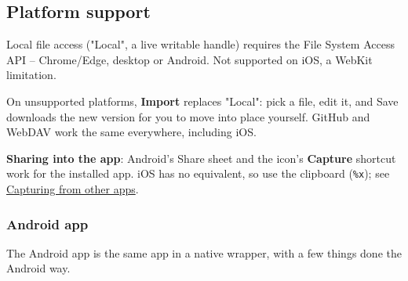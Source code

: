 \documentclass[11pt]{article}
\begin{document}
\subsection{Platform support}
\label{sec:orgc1b1d56}
Local file access ("Local", a live writable handle) requires the File System Access API -- Chrome/Edge, desktop or Android. Not supported on iOS, a WebKit limitation.

On unsupported platforms, \textbf{Import} replaces "Local": pick a file, edit it, and Save downloads the new version for you to move into place yourself. GitHub and WebDAV work the same everywhere, including iOS.

\textbf{Sharing into the app}: Android's Share sheet and the icon's \textbf{Capture} shortcut work for the installed app. iOS has no equivalent, so use the clipboard (\texttt{\%x}); see \hyperref[sec:org46417ca]{Capturing from other apps}.

\subsubsection{Android app}
\label{sec:org5b8e0d4}
The Android app is the same app in a native wrapper, with a few things done the Android way.
\end{document}
